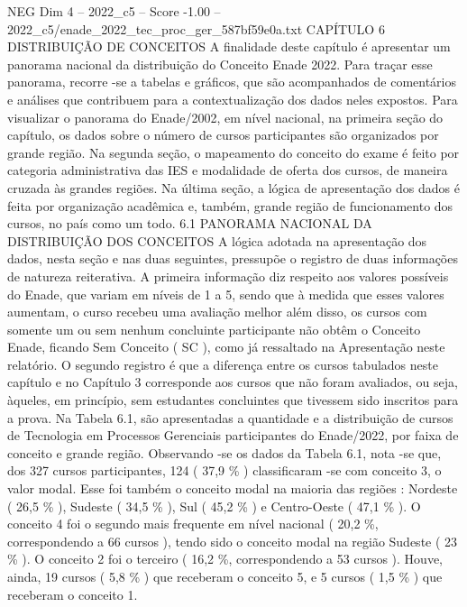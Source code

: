 \begin{textsample}{NEG Dim 4 – 2022\_c5 – Score -1.00 – 2022\_c5/enade\_2022\_tec\_proc\_ger\_587bf59e0a.txt}  \label{ex:f4_neg_077}
CAPÍTULO 6 DISTRIBUIÇÃO DE CONCEITOS A finalidade deste capítulo é apresentar um panorama nacional da distribuição do Conceito Enade 2022.
Para traçar esse panorama, recorre -se a tabelas e gráficos, que são acompanhados de comentários e análises que contribuem para a contextualização dos dados neles expostos.
Para visualizar o panorama do Enade/2002, em nível nacional, na primeira seção do capítulo, os dados sobre o número de cursos participantes são organizados por grande região.
Na segunda seção, o mapeamento do conceito do exame é feito por categoria administrativa das IES e modalidade de oferta dos cursos, de maneira cruzada às grandes regiões.
Na última seção, a lógica de apresentação dos dados é feita por organização acadêmica e, também, grande região de funcionamento dos cursos, no país como um todo. 6.1 PANORAMA NACIONAL DA DISTRIBUIÇÃO DOS CONCEITOS A lógica adotada na apresentação dos dados, nesta seção e nas duas seguintes, pressupõe o registro de duas informações de natureza reiterativa.
A primeira informação diz respeito aos valores possíveis do Enade, que variam em níveis de 1 a 5, sendo que à medida que esses valores aumentam, o curso recebeu uma avaliação melhor além disso, os cursos com somente um ou sem nenhum concluinte participante não obtêm o Conceito Enade, ficando Sem Conceito ( SC ), como já ressaltado na Apresentação neste relatório.
O segundo registro é que a diferença entre os cursos tabulados neste capítulo e no Capítulo 3 corresponde aos cursos que não foram avaliados, ou seja, àqueles, em princípio, sem estudantes concluintes que tivessem sido inscritos para a prova.
Na Tabela 6.1, são apresentadas a quantidade e a distribuição de cursos de Tecnologia em Processos Gerenciais participantes do Enade/2022, por faixa de conceito e grande região.
Observando -se os dados da Tabela 6.1, nota -se que, dos 327 cursos participantes, 124 ( 37,9 \% ) classificaram -se com conceito 3, o valor modal.
Esse foi também o conceito modal na maioria das regiões : Nordeste ( 26,5 \% ), Sudeste ( 34,5 \% ), Sul ( 45,2 \% ) e Centro-Oeste ( 47,1 \% ).
O conceito 4 foi o segundo mais frequente em nível nacional ( 20,2 \%, correspondendo a 66 cursos ), tendo sido o conceito modal na região Sudeste ( 23 \% ).
O conceito 2 foi o terceiro ( 16,2 \%, correspondendo a 53 cursos ).
Houve, ainda, 19 cursos ( 5,8 \% ) que receberam o conceito 5, e 5 cursos ( 1,5 \% ) que receberam o conceito 1.

\end{textsample}
